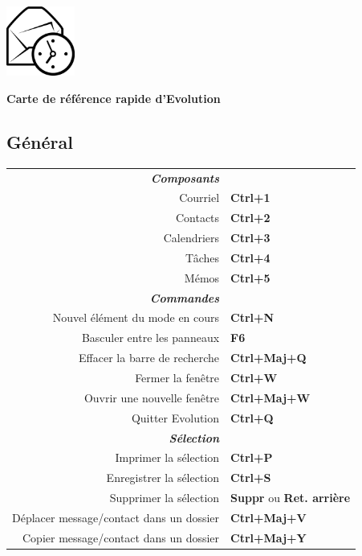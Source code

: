 \documentclass[12pt]{article}
\date {}
\begin{document}
	\begin{landscape}


	\begin{center}
	\begin{minipage}[m]
		{1in}\includegraphics[height=0.9in]{../evolution-logo.eps}\hspace{5mm}
	\end{minipage}
	\hspace{5mm}
	\textbf{\Huge{Carte de référence rapide d'Evolution}}
	\end{center}

	\begin{center}
	\begin{multicols}{2}
	\section*{Général}
	\begin{tabular*}{4in}{rp{1.5in}}
		\textit{\textbf{Composants}}		&					\\
		Courriel					& \textbf{Ctrl+1}			\\
		Contacts				& \textbf{Ctrl+2}			\\
		Calendriers				& \textbf{Ctrl+3}			\\
		Tâches					& \textbf{Ctrl+4}			\\
		\vspace{1.5mm}
		Mémos					& \textbf{Ctrl+5}			\\
		\textit{\textbf{Commandes}}		&					\\
		Nouvel élément du mode en cours		& \textbf{Ctrl+N}			\\
		Basculer entre les panneaux		& \textbf{F6}				\\
		Effacer la barre de recherche			& \textbf{Ctrl+Maj+Q}			\\
		Fermer la fenêtre				& \textbf{Ctrl+W}			\\
		Ouvrir une nouvelle fenêtre				& \textbf{Ctrl+Maj+W}			\\
		\vspace{1.5mm}
		Quitter Evolution				& \textbf{Ctrl+Q}			\\
		\textit{\textbf{Sélection}}		&					\\
		Imprimer la sélection				& \textbf{Ctrl+P}			\\
		Enregistrer la sélection				& \textbf{Ctrl+S}			\\
		Supprimer la sélection			& \textbf{Suppr} ou \textbf{Ret. arrière}	\\
		Déplacer message/contact dans un dossier		& \textbf{Ctrl+Maj+V}			\\
		Copier message/contact dans un dossier		& \textbf{Ctrl+Maj+Y}			\\
	\end{tabular*}

\end{multicols}
\end{center}
\end{landscape}
\end{document}
